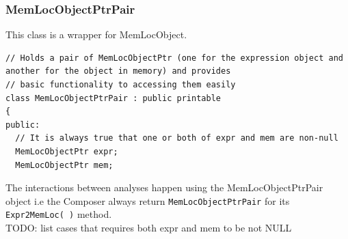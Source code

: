 \documentclass{article}
\begin{document}
\subsubsection{MemLocObjectPtrPair}
This class is a wrapper for MemLocObject.
\begin{lstlisting}
// Holds a pair of MemLocObjectPtr (one for the expression object and another for the object in memory) and provides 
// basic functionality to accessing them easily
class MemLocObjectPtrPair : public printable
{
public:
  // It is always true that one or both of expr and mem are non-null
  MemLocObjectPtr expr;
  MemLocObjectPtr mem;
\end{lstlisting}
The interactions between analyses happen using the
MemLocObjectPtrPair object i.e the
Composer always return \texttt{MemLocObjectPtrPair} for its
\texttt{Expr2MemLoc( )} method.\\
\large{TODO: list cases that requires both expr and mem to be not NULL}
\end{document}
